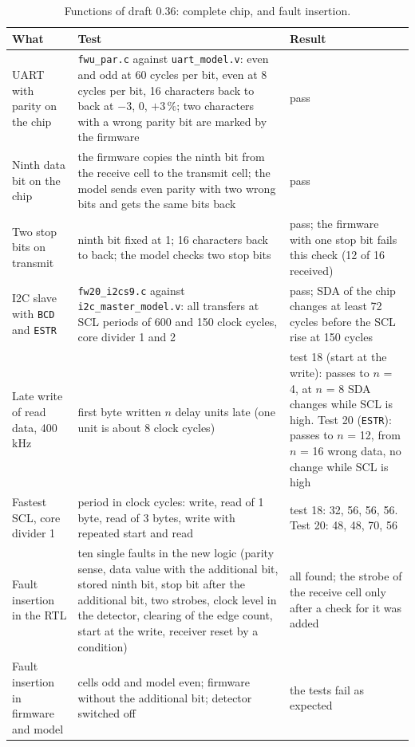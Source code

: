 \documentclass[10pt,a4paper]{article}
\begin{document}
\begin{table}[H]
\centering\small
\begin{tabularx}{\linewidth}{@{}LLL@{}}
\toprule
What & Test & Result \\
\midrule
UART with parity on the chip & \texttt{fwu\_par.c} against \texttt{uart\_model.v}: even and odd at 60 cycles per bit, even at 8 cycles per bit, 16 characters back to back at $-3$, 0, $+3\,\%$; two characters with a wrong parity bit are marked by the firmware & pass \\
Ninth data bit on the chip & the firmware copies the ninth bit from the receive cell to the transmit cell; the model sends even parity with two wrong bits and gets the same bits back & pass \\
Two stop bits on transmit & ninth bit fixed at 1; 16 characters back to back; the model checks two stop bits & pass; the firmware with one stop bit fails this check (12 of 16 received) \\
I2C slave with \texttt{BCD} and \texttt{ESTR} & \texttt{fw20\_i2cs9.c} against \texttt{i2c\_master\_model.v}: all transfers at SCL periods of 600 and 150 clock cycles, core divider 1 and 2 & pass; SDA of the chip changes at least 72 cycles before the SCL rise at 150 cycles \\
Late write of read data, 400\,kHz & first byte written $n$ delay units late (one unit is about 8 clock cycles) & test 18 (start at the write): passes to $n$ = 4, at $n$ = 8 SDA changes while SCL is high. Test 20 (\texttt{ESTR}): passes to $n$ = 12, from $n$ = 16 wrong data, no change while SCL is high \\
Fastest SCL, core divider 1 & period in clock cycles: write, read of 1 byte, read of 3 bytes, write with repeated start and read & test 18: 32, 56, 56, 56. Test 20: 48, 48, 70, 56 \\
Fault insertion in the RTL & ten single faults in the new logic (parity sense, data value with the additional bit, stored ninth bit, stop bit after the additional bit, two strobes, clock level in the detector, clearing of the edge count, start at the write, receiver reset by a condition) & all found; the strobe of the receive cell only after a check for it was added \\
Fault insertion in firmware and model & cells odd and model even; firmware without the additional bit; detector switched off & the tests fail as expected \\
\bottomrule
\end{tabularx}
\caption{Functions of draft 0.36: complete chip, and fault insertion.}
\end{table}
\end{document}

